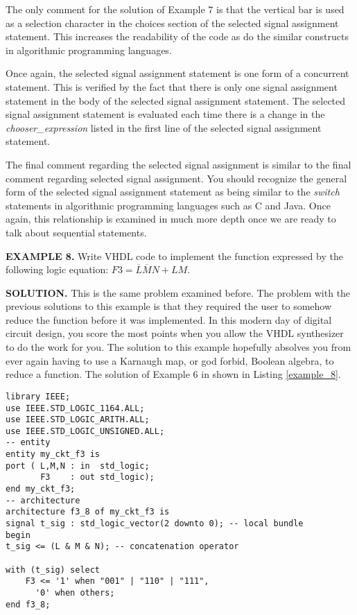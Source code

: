The only comment for the solution of Example 7 is that the vertical bar is used as a selection character in the choices section of the selected signal assignment statement. This increases the readability of the code as do the similar constructs in algorithmic programming languages.

Once again, the selected signal assignment statement is one form of a concurrent statement. This is verified by the fact that there is only one signal assignment statement in the body of the selected signal assignment statement. The selected signal assignment statement is evaluated each time there is a change in the \textit{chooser\_expression} listed in the first line of the selected signal assignment statement.

The final comment regarding the selected signal assignment is similar to the final comment regarding selected signal assignment. You should recognize the general form of the selected signal assignment statement as being similar to the \textit{switch} statements in algorithmic programming languages such as C and Java. Once again, this relationship is examined in much more depth once we are ready to talk about sequential statements.

\begin{leftbar}
\noindent
\textbf{EXAMPLE 8.}
Write VHDL code to implement the function expressed by the following logic equation: $F3=\overline{L}\overline{M}N+LM$.
\end{leftbar}
\noindent
\textbf{SOLUTION.} This is the same problem examined before. The problem with the previous solutions to this example is that they required the user to somehow reduce the function before it was implemented. In this modern day of digital circuit design, you score the most points when you allow the VHDL synthesizer to do the work for you. The solution to this example hopefully absolves you from ever again having to use a Karnaugh map, or god forbid, Boolean algebra, to reduce a function. The solution of Example 6 in shown in Listing \ref{example_8}.

\begin{lstlisting}[label=example_8, caption=Solution of Example 8.]
library IEEE;
use IEEE.STD_LOGIC_1164.ALL;
use IEEE.STD_LOGIC_ARITH.ALL;
use IEEE.STD_LOGIC_UNSIGNED.ALL;
-- entity
entity my_ckt_f3 is
port ( L,M,N : in  std_logic;
       F3    : out std_logic);
end my_ckt_f3;
-- architecture
architecture f3_8 of my_ckt_f3 is
signal t_sig : std_logic_vector(2 downto 0); -- local bundle
begin
t_sig <= (L & M & N); -- concatenation operator

with (t_sig) select
    F3 <= '1' when "001" | "110" | "111",
	  '0' when others;
end f3_8;
\end{lstlisting}

